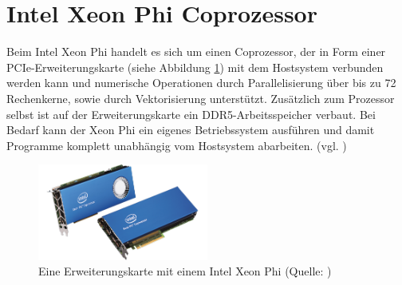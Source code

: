\documentclass[../main.tex]{subfiles}
\begin{document}
\section{Intel Xeon Phi Coprozessor}
Beim Intel Xeon Phi handelt es sich um einen Coprozessor, der in Form einer PCIe-Erweiterungskarte (siehe Abbildung \ref{pic:xeonphicard}) mit dem Hostsystem verbunden werden kann und numerische Operationen durch Parallelisierung über bis zu 72 Rechenkerne, sowie durch Vektorisierung unterstützt. Zusätzlich zum Prozessor selbst ist auf der Erweiterungskarte ein DDR5-Arbeitsspeicher verbaut. Bei Bedarf kann der Xeon Phi ein eigenes Betriebssystem ausführen und damit Programme komplett unabhängig vom Hostsystem abarbeiten. (vgl. \cite{intelxeonphiprocessors})
\begin{figure}
    \centering 
       \includegraphics[width=0.5\textwidth]{../images/Schmidt/xeon_phi_cards.png} 
    \caption {Eine Erweiterungskarte mit einem Intel Xeon Phi (Quelle: \parencite{intelMICarchitecture})} 
    \label{pic:xeonphicard} 
\end{figure} 
\end{document}
